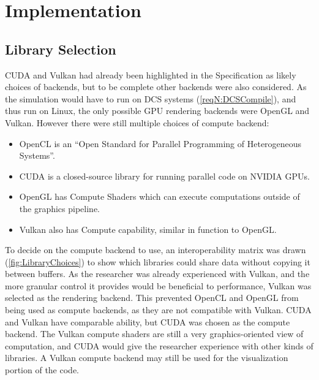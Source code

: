 
\chapter{Implementation}
\label{sec:Implementation} 

\section{Library Selection}
\label{sec:LibrarySelection}

CUDA and Vulkan had already been highlighted in the Specification as likely choices of backends, but to be complete other backends were also considered.
As the simulation would have to run on DCS systems (\cref{reqN:DCSCompile}), and thus run on Linux, the only possible GPU rendering backends were OpenGL and Vulkan.
However there were still multiple choices of compute backend:
\begin{itemize}
    \item OpenCL\cite{tool:OpenCL1.0PressRelease} is an ``Open Standard for Parallel Programming of Heterogeneous Systems''\cite{TheKhronosGroupOpenCLInc}.
    \item CUDA\cite{tool:CUDA} is a closed-source library for running parallel code on NVIDIA GPUs.
    \item OpenGL has Compute Shaders\cite{tool:OpenGLComputeShaderExt} which can execute computations outside of the graphics pipeline.
    \item Vulkan also has Compute capability\cite{TheKhronosGroupVulkanGuide}, similar in function to OpenGL.
\end{itemize}
To decide on the compute backend to use, an interoperability matrix was drawn (\cref{fig:LibraryChoices}) to show which libraries could share data without copying it between buffers.
As the researcher was already experienced with Vulkan, and the more granular control it provides would be beneficial to performance, Vulkan was selected as the rendering backend.
This prevented OpenCL and OpenGL from being used as compute backends, as they are not compatible with Vulkan.
CUDA and Vulkan have comparable ability, but CUDA was chosen as the compute backend.
The Vulkan compute shaders are still a very graphics-oriented view of computation, and CUDA would give the researcher experience with other kinds of libraries.
A Vulkan compute backend may still be used for the visualization portion of the code.


